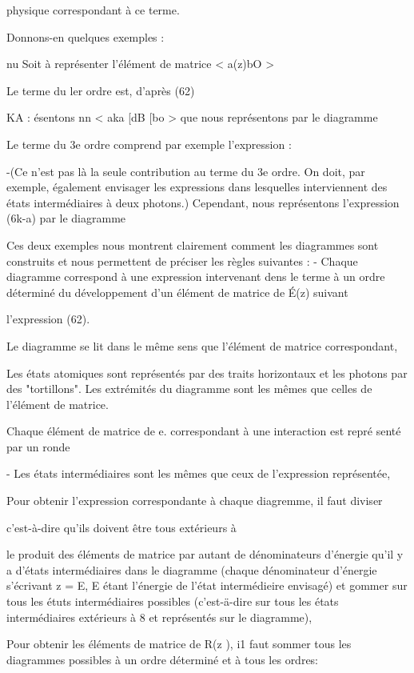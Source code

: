 physique correspondant à ce terme.

Donnons-en quelques exemples :

nu
Soit à représenter l'élément de matrice < a(z)bO >

Le terme du ler ordre est, d'après (62)

KA
: ésentons nn
< aka [dB [bo > que nous représentons par le diagramme

Le terme du 3e ordre comprend par exemple l'expression :

-(Ce n'est pas là la seule contribution au terme du 3e ordre.
On doit, par exemple, également envisager les expressions dans lesquelles
interviennent des états intermédiaires à deux photons.)
Cependant, nous représentons l'expression (6k-a) par le diagramme

Ces deux exemples nous montrent clairement comment les diagrammes sont construits et nous permettent de préciser les règles suivantes :
- Chaque diagramme correspond à une expression intervenant dens le terme à un
ordre déterminé du développement d'un élément de matrice de É(z) suivant

l'expression (62).

Le diagramme se lit dans le même sens que l'élément de matrice correspondant,

Les états atomiques sont représentés par des traits horizontaux et les photons
par des "tortillons".
Les extrémités du diagramme sont les mêmes que celles de l'élément de matrice.

Chaque élément de matrice de e. correspondant à une interaction est repré
senté par un ronde

- Les états intermédiaires sont les mêmes que ceux de l'expression représentée,

Pour obtenir l'expression correspondante à chaque diagremme, il faut diviser

c'est-à-dire qu'ils doivent être tous extérieurs à

le produit des éléments de matrice par autant de dénominateurs d'énergie qu'il
y a d'états intermédiaires dans le diagramme (chaque dénominateur d'énergie
s'écrivant z = E, E étant l'énergie de l'état intermédieire envisagé) et
gommer sur tous les étuts intermédiaires possibles (c'est-ä-dire sur tous les
états intermédiaires extérieurs à 8 et représentés sur le diagramme),

Pour obtenir les éléments de matrice de R(z ), i1 faut sommer
tous les diagrammes possibles à un ordre déterminé et à tous les ordres:

